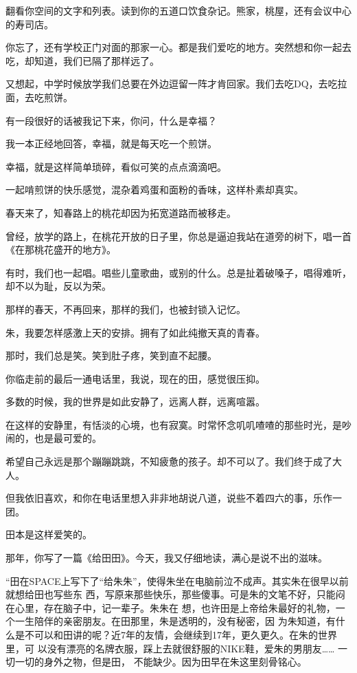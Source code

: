 \documentclass[12pt,a4paper]{article}
\begin{document}
		翻看你空间的文字和列表。读到你的五道口饮食杂记。熊家，桃屋，还有会议中心的寿司店。\par
		你忘了，还有学校正门对面的那家一心。都是我们爱吃的地方。突然想和你一起去吃，却知道，我们已隔了那样远了。\par
		又想起，中学时候放学我们总要在外边逗留一阵才肯回家。我们去吃DQ，去吃拉面，去吃煎饼。\par
		有一段很好的话被我记下来，你问，什么是幸福？\par
		我一本正经地回答，幸福，就是每天吃一个煎饼。\par
		幸福，就是这样简单琐碎，看似可笑的点点滴滴吧。\par
		一起啃煎饼的快乐感觉，混杂着鸡蛋和面粉的香味，这样朴素却真实。\par
		春天来了，知春路上的桃花却因为拓宽道路而被移走。\par
		曾经，放学的路上，在桃花开放的日子里，你总是逼迫我站在道旁的树下，唱一首《在那桃花盛开的地方》。\par
		有时，我们也一起唱。唱些儿童歌曲，或别的什么。总是扯着破嗓子，唱得难听，却不以为耻，反以为荣。\par
		那样的春天，不再回来，那样的我们，也被封锁入记忆。\par
		朱，我要怎样感激上天的安排。拥有了如此纯撤天真的青春。\par
		那时，我们总是笑。笑到肚子疼，笑到直不起腰。\par
		你临走前的最后一通电话里，我说，现在的田，感觉很压抑。\par
		多数的时候，我的世界是如此安静了，远离人群，远离喧嚣。\par
		在这样的安静里，有恬淡的心境，也有寂寞。时常怀念叽叽喳喳的那些时光，是吵闹的，也是最可爱的。\par
		希望自己永远是那个蹦蹦跳跳，不知疲惫的孩子。却不可以了。我们终于成了大人。\par
		但我依旧喜欢，和你在电话里想入非非地胡说八道，说些不着四六的事，乐作一团。\par
		田本是这样爱笑的。

		那年，你写了一篇《给田田》。今天，我又仔细地读，满心是说不出的滋味。

		“田在SPACE上写下了“给朱朱”，使得朱坐在电脑前泣不成声。其实朱在很早以前就想给田也写些东
	西，写原来那些快乐，那些傻事。可是朱的文笔不好，只能闷在心里，存在脑子中，记一辈子。朱朱在
	想，也许田是上帝给朱最好的礼物，一个一生陪伴的亲密朋友。在田那里，朱是透明的，没有秘密，因
	为朱知道，有什么是不可以和田讲的呢？近7年的友情，会继续到17年，更久更久。在朱的世界里，可
	以没有漂亮的名牌衣服，踩上去就很舒服的NIKE鞋，爱朱的男朋友…… 一切一切的身外之物，但是田，
	不能缺少。因为田早在朱这里刻骨铭心。
\end{document}
